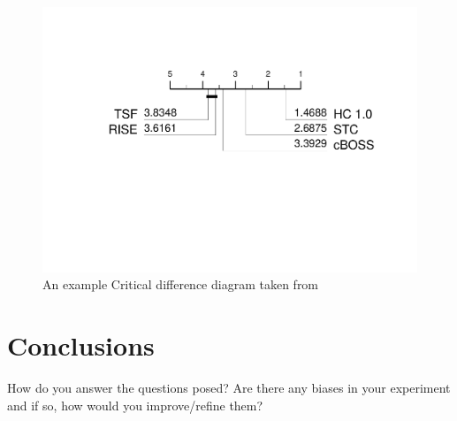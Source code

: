 \documentclass{cmppgr}
\begin{document}
   \begin{figure}[hb]
    	\centering
        \includegraphics[width=\linewidth,trim={2cm 8cm 2cm 4cm},clip]{cd_HC-Analysis_ACCS.pdf}
        \caption{An example Critical difference diagram taken from~\cite{bagnall20hivecote1}}
        \label{fig:hc1.0}
    \end{figure}
    

\section{ Conclusions}

How do you answer the questions posed? Are there any biases in your experiment and if so, how would you improve/refine them?


 
\end{document}
